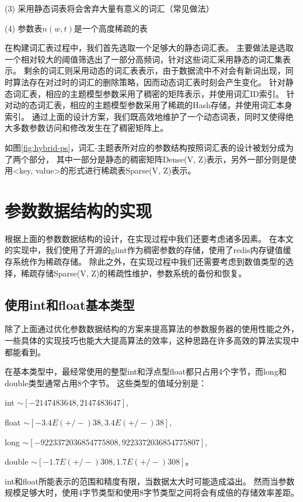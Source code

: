 (3) 采用静态词表将会舍弃大量有意义的词汇（常见做法）

(4) 参数表$n(w,t)$是一个高度稀疏的表


在构建词汇表过程中，我们首先选取一个足够大的静态词汇表。
主要做法是选取一个相对较大的阈值筛选出了一部分高频词，针对这些词汇采用静态的词汇集表示。
剩余的词汇则采用动态的词汇表表示，由于数据流中不对会有新词出现，同时算法存在对过时的词汇的删除策略，因而动态词汇表时刻会产生变化。
针对静态词汇表，相应的主题模型参数采用了稠密的矩阵表示，并使用词汇ID索引。
针对动的态词汇表，相应的主题模型参数采用了稀疏的Hash存储，并使用词汇本身索引。
通过上面的设计方案，我们既高效地维护了一个动态词表，同时又使得绝大多数参数访问和修改发生在了稠密矩阵上。

如图\ref{fig:hybrid-ps}，词汇-主题表所对应的参数结构按照词汇表的设计被划分成为了两个部分，
其中一部分是静态的稠密矩阵Dense(V, Z)表示，另外一部分则是使用<key, value>的形式进行稀疏表Sparse(V, Z)表示。

\section{参数数据结构的实现}
根据上面的参数数据结构的设计，在实现过程中我们还要考虑诸多因素。
在本文的实现中，我们使用了开源的glint\cite{glint}作为稠密参数的存储，使用了redis\cite{redis}内存键值缓存系统作为稀疏存储。
除此之外，在实现过程中我们还需要考虑到数值类型的选择，稀疏存储Sparse(V, Z)的稀疏性维护，参数系统的备份和恢复。

\subsection{使用int和float基本类型}
除了上面通过优化参数数据结构的方案来提高算法的参数服务器的使用性能之外，
一些具体的实现技巧也能大大提高算法的效率，这种思路在许多高效的算法实现中都能看到。

在基本类型中，最经常使用的整型int和浮点型float都只占用4个字节，而long和double类型通常占用8个字节。
这些类型的值域分别是：

int $\sim [-2147483648, 2147483647]$,

float $\sim [-3.4E(+/-)38, 3.4E(+/-)38]$, 

long $\sim [-9223372036854775808, 9223372036854775807]$,
	 
double $\sim [-1.7E(+/-)308, 1.7E(+/-)308]$。

int和float所能表示的范围和精度有限，当数据太大时可能造成溢出。
然而当参数规模足够大时，使用4字节类型和使用8字节类型之间将会有成倍的存储效率差距。

